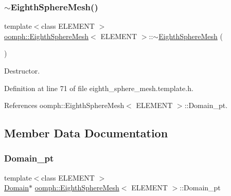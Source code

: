 \mbox{\label{classoomph_1_1EighthSphereMesh_a425c3de92974d00dbb126f4cbbaf8e3b}} 
\subsubsection{\texorpdfstring{$\sim$\+Eighth\+Sphere\+Mesh()}{~EighthSphereMesh()}}
{\footnotesize\ttfamily template$<$class E\+L\+E\+M\+E\+NT $>$ \\
\hyperlink{classoomph_1_1EighthSphereMesh}{oomph\+::\+Eighth\+Sphere\+Mesh}$<$ E\+L\+E\+M\+E\+NT $>$\+::$\sim$\hyperlink{classoomph_1_1EighthSphereMesh}{Eighth\+Sphere\+Mesh} (\begin{DoxyParamCaption}{ }\end{DoxyParamCaption})\hspace{0.3cm}{\ttfamily [inline]}}



Destructor. 



Definition at line 71 of file eighth\+\_\+sphere\+\_\+mesh.\+template.\+h.



References oomph\+::\+Eighth\+Sphere\+Mesh$<$ E\+L\+E\+M\+E\+N\+T $>$\+::\+Domain\+\_\+pt.



\subsection{Member Data Documentation}
\mbox{\label{classoomph_1_1EighthSphereMesh_a4b08d71a9da8cbd278cc51919cbb1a17}} 
\subsubsection{\texorpdfstring{Domain\+\_\+pt}{Domain\_pt}}
{\footnotesize\ttfamily template$<$class E\+L\+E\+M\+E\+NT $>$ \\
\hyperlink{classoomph_1_1Domain}{Domain}$\ast$ \hyperlink{classoomph_1_1EighthSphereMesh}{oomph\+::\+Eighth\+Sphere\+Mesh}$<$ E\+L\+E\+M\+E\+NT $>$\+::Domain\+\_\+pt\hspace{0.3cm}{\ttfamily [protected]}}



